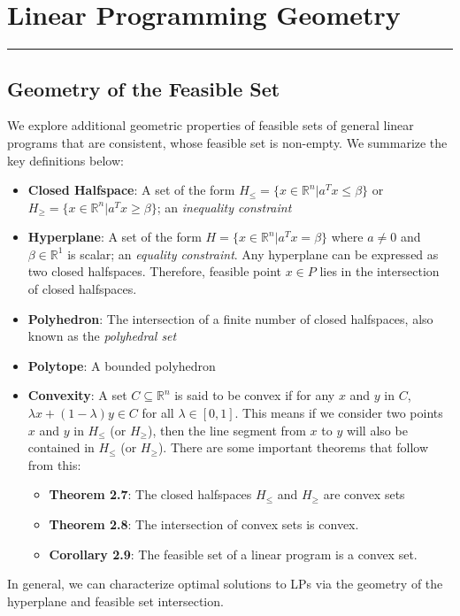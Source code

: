 \documentclass[11pt]{article}
\newcommand{\R}{\mathbb{R}}
\begin{document}
\section{Linear Programming Geometry}
\hrule \vspace{15pt}
\subsection{Geometry of the Feasible Set}
We explore additional geometric properties of feasible sets of general linear programs that are consistent, whose feasible set is non-empty.   We summarize the key definitions below: 
\begin{itemize}
\item \textbf{Closed Halfspace}: A set of the form $H_{\leq} = \{ x \in \R^n | a^Tx \leq \beta \}$ or $H_{\geq} = \{ x \in \R^n | a^Tx \geq \beta \}$; an \textit{inequality constraint}
\item \textbf{Hyperplane}: A set of the form $H = \{ x \in \R^n | a^Tx = \beta \}$ where $a \neq 0$ and $\beta \in \R^1$ is scalar; an \textit{equality constraint}. Any hyperplane can be expressed as two closed halfspaces.  Therefore, feasible point $x \in P$ lies in the intersection of closed halfspaces. 
\item \textbf{Polyhedron}: The intersection of a finite number of closed halfspaces, also known as the \textit{polyhedral set}
\item \textbf{Polytope}: A bounded polyhedron
\item \textbf{Convexity}: A set $C \subseteq \R^n$ is said to be convex if for any $x$ and $y$ in $C$, $\lambda x+(1- \lambda)y \in C$ for all $ \lambda \in [0, 1]$. This means if we consider two points $x$ and $y$ in $H_{\leq}$ (or $H_{\geq}$), then the line segment from $x$ to $y$ will also be contained in $H_{\leq}$ (or $H_{\geq}$). There are some important theorems that follow from this:
\begin{itemize}
\item \textbf{Theorem 2.7}: The closed halfspaces $H_{\leq}$ and $H_{\geq}$ are convex sets
\item \textbf{Theorem 2.8}: The intersection of convex sets is convex.
\item \textbf{Corollary 2.9}: The feasible set of a linear program is a convex set.
\end{itemize}
\end{itemize}
In general, we can characterize optimal solutions to LPs via the geometry of the hyperplane and feasible set intersection. \\ \\
\end{document}
